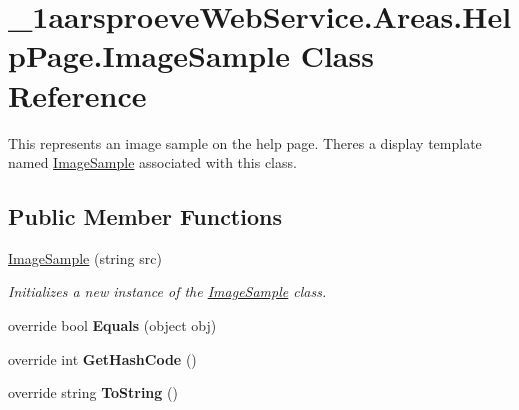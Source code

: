 \hypertarget{class__1aarsproeve_web_service_1_1_areas_1_1_help_page_1_1_image_sample}{}\section{\+\_\+1aarsproeve\+Web\+Service.\+Areas.\+Help\+Page.\+Image\+Sample Class Reference}
\label{class__1aarsproeve_web_service_1_1_areas_1_1_help_page_1_1_image_sample}


This represents an image sample on the help page. There\textquotesingle{}s a display template named \hyperlink{class__1aarsproeve_web_service_1_1_areas_1_1_help_page_1_1_image_sample}{Image\+Sample} associated with this class.  


\subsection*{Public Member Functions}
\begin{DoxyCompactItemize}
\item 
\hyperlink{class__1aarsproeve_web_service_1_1_areas_1_1_help_page_1_1_image_sample_a1e2df780051c1af035bdaba293c69c16}{Image\+Sample} (string src)
\begin{DoxyCompactList}\small\item\em Initializes a new instance of the \hyperlink{class__1aarsproeve_web_service_1_1_areas_1_1_help_page_1_1_image_sample}{Image\+Sample} class. \end{DoxyCompactList}\item 
\hypertarget{class__1aarsproeve_web_service_1_1_areas_1_1_help_page_1_1_image_sample_a88789358633abe9acb1e29001576baf7}{}override bool {\bfseries Equals} (object obj)\label{class__1aarsproeve_web_service_1_1_areas_1_1_help_page_1_1_image_sample_a88789358633abe9acb1e29001576baf7}

\item 
\hypertarget{class__1aarsproeve_web_service_1_1_areas_1_1_help_page_1_1_image_sample_ad489923ace1fb65638e7ac2961e46af0}{}override int {\bfseries Get\+Hash\+Code} ()\label{class__1aarsproeve_web_service_1_1_areas_1_1_help_page_1_1_image_sample_ad489923ace1fb65638e7ac2961e46af0}

\item 
\hypertarget{class__1aarsproeve_web_service_1_1_areas_1_1_help_page_1_1_image_sample_a8f0eef1536d1864d9bcc71ccf3e5c86f}{}override string {\bfseries To\+String} ()\label{class__1aarsproeve_web_service_1_1_areas_1_1_help_page_1_1_image_sample_a8f0eef1536d1864d9bcc71ccf3e5c86f}

\end{DoxyCompactItemize}
